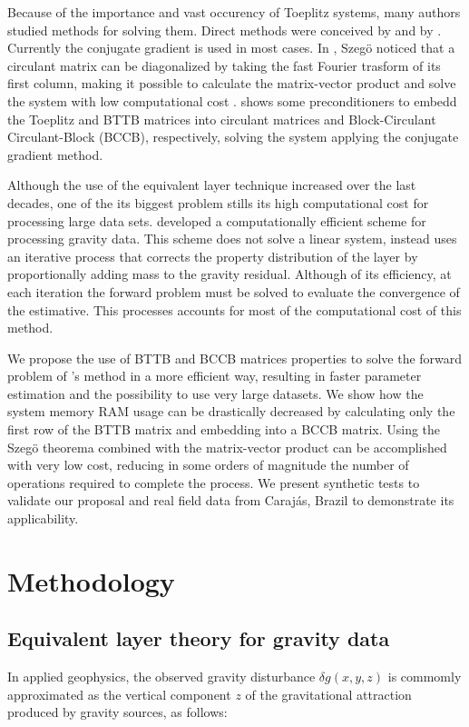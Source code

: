 \documentclass[paper]{geophysics}
\begin{document}
Because of the importance and vast occurency of Toeplitz systems, many authors studied methods for solving them. Direct methods were conceived by \cite{levinson1946wiener} and by \cite{trench1964algorithm}. Currently the conjugate gradient is used in most cases. In \cite{grenander1984szeg}, Szeg\"{o} noticed that a circulant matrix can be diagonalized by taking the fast Fourier trasform of its first column, making it possible to calculate the matrix-vector product and solve the system with low computational cost \cite[]{strang1986introduction,olkin1986linear}. \cite{chan2007introduction} shows some preconditioners to embedd the Toeplitz and BTTB matrices into circulant matrices and Block-Circulant Circulant-Block (BCCB), respectively, solving the system applying the conjugate gradient method.

Although the use of the equivalent layer technique increased over the last decades, one of the its biggest problem stills its high computational cost for processing large data sets. \cite{siqueira2017fast} developed a computationally efficient scheme for processing gravity data. This scheme does not solve a linear system, instead uses an iterative process that corrects the property distribution of the layer by proportionally adding mass to the gravity residual. Although of its efficiency, at each iteration the forward problem must be solved to evaluate the convergence of the estimative. This processes accounts for most of the computational cost of this method.

We propose the use of BTTB and BCCB matrices properties to solve the forward problem of \cite{siqueira2017fast}'s method in a more efficient way, resulting in faster parameter estimation and the possibility to use very large datasets. We show how the system memory RAM usage can be drastically decreased by calculating only the first row of the BTTB matrix and embedding into a BCCB matrix. Using the Szeg\"{o} theorema  combined with \cite{strang1986introduction} the matrix-vector product can be accomplished with very low cost, reducing in some orders of magnitude the number of operations required to complete the process. We present synthetic tests to validate our proposal and real field data from Caraj\'as, Brazil to demonstrate its applicability.


\section*{Methodology}
\subsection{Equivalent layer theory for gravity data}
In applied geophysics, the observed gravity disturbance $\delta g(x, y, z)$ \citep{heiskanen1967physical} is commomly approximated as the vertical component $z$ of the gravitational attraction produced by gravity sources, as follows:
\end{document}
